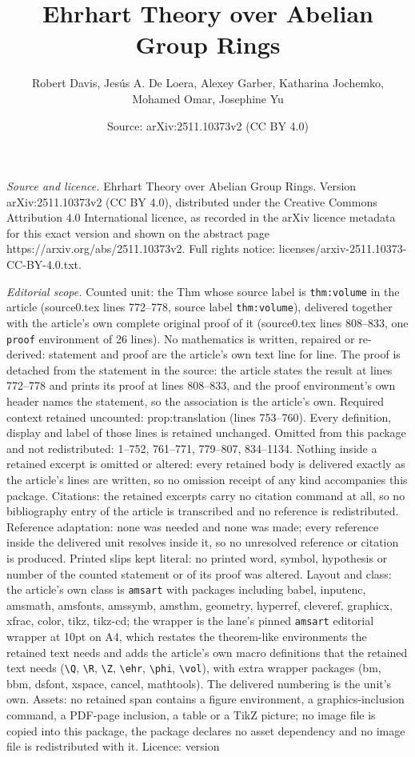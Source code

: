 \documentclass[10pt,a4paper]{amsart}
\title[Ehrhart Theory over Abelian Group Rings]{Ehrhart Theory over Abelian Group Rings}
\author{Robert Davis, Jes\'us A. De Loera, Alexey Garber, Katharina Jochemko, Mohamed Omar, Josephine Yu}
\date{Source: arXiv:2511.10373v2 (CC BY 4.0)}
\begin{document}
\maketitle

\noindent\emph{Source and licence.} Ehrhart Theory over Abelian Group Rings. Version arXiv:2511.10373v2 (CC BY 4.0), distributed under the Creative Commons Attribution 4.0 International licence, as recorded in the arXiv licence metadata for this exact version and shown on the abstract page https://arxiv.org/abs/2511.10373v2. Full rights notice: licenses/arxiv-2511.10373-CC-BY-4.0.txt.\par\smallskip

\noindent\textit{Editorial scope.} Counted unit: the Thm whose source label is \texttt{thm:volume} in the article (source0.tex lines 772--778, source label \texttt{thm:volume}), delivered together with the article's own complete original proof of it (source0.tex lines 808--833, one \texttt{proof} environment of 26 lines). No mathematics is written, repaired or re-derived: statement and proof are the article's own text line for line. The proof is detached from the statement in the source: the article states the result at lines 772--778 and prints its proof at lines 808--833, and the proof environment's own header names the statement, so the association is the article's own. Required context retained uncounted: prop:translation (lines 753--760). Every definition, display and label of those lines is retained unchanged. Omitted from this package and not redistributed: 1--752, 761--771, 779--807, 834--1134. Nothing inside a retained excerpt is omitted or altered: every retained body is delivered exactly as the article's lines are written, so no omission receipt of any kind accompanies this package. Citations: the retained excerpts carry no citation command at all, so no bibliography entry of the article is transcribed and no reference is redistributed. Reference adaptation: none was needed and none was made; every reference inside the delivered unit resolves inside it, so no unresolved reference or citation is produced. Printed slips kept literal: no printed word, symbol, hypothesis or number of the counted statement or of its proof was altered. Layout and class: the article's own class is \texttt{amsart} with packages including babel, inputenc, amsmath, amsfonts, amssymb, amsthm, geometry, hyperref, cleveref, graphicx, xfrac, color, tikz, tikz-cd; the wrapper is the lane's pinned \texttt{amsart} editorial wrapper at 10pt on A4, which restates the theorem-like environments the retained text needs and adds the article's own macro definitions that the retained text needs (\texttt{\textbackslash Q}, \texttt{\textbackslash R}, \texttt{\textbackslash Z}, \texttt{\textbackslash ehr}, \texttt{\textbackslash phi}, \texttt{\textbackslash vol}), with extra wrapper packages (bm, bbm, dsfont, xspace, cancel, mathtools). The delivered numbering is the unit's own. Assets: no retained span contains a figure environment, a graphics-inclusion command, a PDF-page inclusion, a table or a TikZ picture; no image file is copied into this package, the package declares no asset dependency and no image file is redistributed with it. Licence: version 
\end{document}
